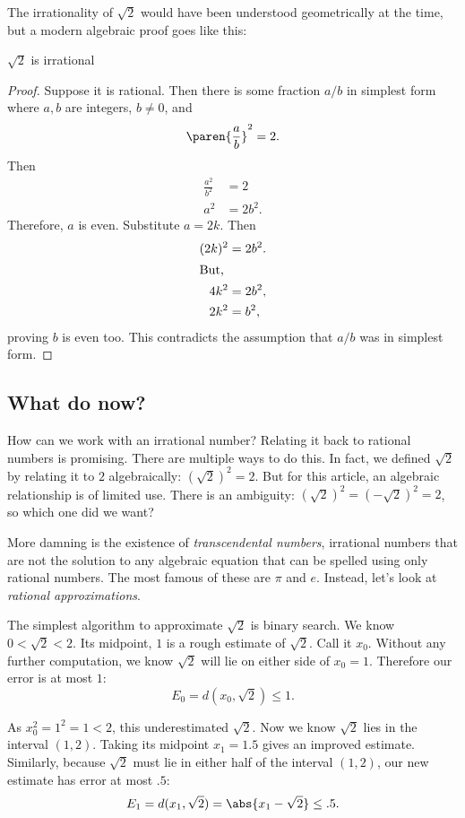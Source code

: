 \documentclass{scrartcl}
\newcommand{\dist}{d}
\begin{document}
The irrationality of $\sqrt 2$ would have been understood geometrically at the time, but a modern algebraic proof goes like this:
\begin{theorem}\(\sqrt 2\) is irrational
\end{theorem}
\begin{proof}
  Suppose it is rational. Then there is some fraction $a/b$ in simplest form where $a,b$ are integers, $b\neq 0$, and
  \[
    \paren{\frac a b}^{2}=2.
  \]
  Then
  \begin{align*}
    \frac{a^{2}}{b^{2}} &= 2 \\
    a^{2}&= 2 b^{2}.
  \end{align*}
  Therefore, $a$ is even. Substitute $a=2k$. Then
  \begin{align}
    (2k)^{2} &=2 b^{2}. \\
                      \shortintertext{But,}
    4k^{2} &= 2b^{2}, \\
    2k^{2} &= b^{2},
  \end{align}
  proving $b$ is even too. This contradicts the assumption that $a/b$ was in simplest form.
\end{proof}

\subsection{What do now?}
How can we work with an irrational number? Relating it back to rational numbers is promising. There are multiple ways to do this. In fact, we defined $\sqrt 2$ by relating it to $2$ algebraically: $(\sqrt 2)^2 = 2$. But for this article, an algebraic relationship is of limited use. There is an ambiguity: $(\sqrt 2)^{2} = (-\sqrt 2)^{2} = 2$, so which one did we want?

More damning is the existence of \emph{transcendental numbers}, irrational numbers that are not the solution to any algebraic equation that can be spelled using only rational numbers. The most famous of these are $\pi$ and $e$. Instead, let's look at \emph{rational approximations}.

The simplest algorithm to approximate $\sqrt 2$ is binary search. We know $0 < \sqrt 2 < 2$. Its midpoint, $1$ is a rough estimate of $\sqrt 2$. Call it $x_{0}$. Without any further computation, we know $\sqrt 2$ will lie on either side of $x_{0}=1$. Therefore our error is at most $1$:
\[
  E_{0}=\dist(x_{0},\sqrt 2) \leq 1.
\]


As $x_{0}^{2}=1^{2}=1 < 2$, this underestimated $\sqrt 2$.  Now we know $\sqrt 2$ lies in the interval $(1,2)$. Taking its midpoint $x_{1}=1.5$ gives an improved estimate. Similarly, because $\sqrt 2$ must lie in either half of the interval $(1,2)$, our new estimate has error at most $.5$:
\[
  E_{1} = \dist(x_{1},\sqrt 2) = \abs{x_{1} - \sqrt 2} \leq .5.
\]
\end{document}
